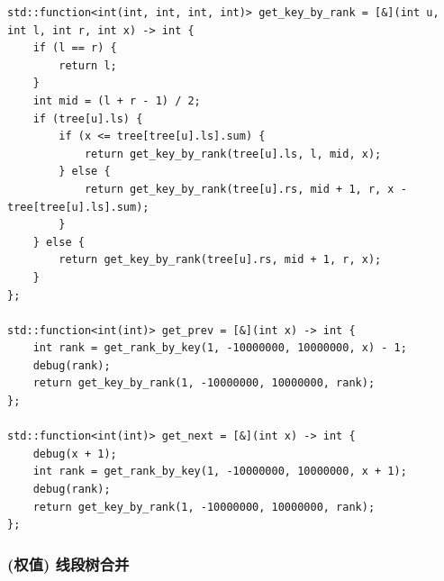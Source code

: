 \documentclass[UTF8, a4paper, titlepage, twoside]{ctexart}
\begin{document}
\begin{lstlisting}[style = cpp]
std::function<int(int, int, int, int)> get_key_by_rank = [&](int u, int l, int r, int x) -> int {
    if (l == r) {
        return l;
    }
    int mid = (l + r - 1) / 2;
    if (tree[u].ls) {
        if (x <= tree[tree[u].ls].sum) {
            return get_key_by_rank(tree[u].ls, l, mid, x);
        } else {
            return get_key_by_rank(tree[u].rs, mid + 1, r, x - tree[tree[u].ls].sum);
        }
    } else {
        return get_key_by_rank(tree[u].rs, mid + 1, r, x);
    }
};

std::function<int(int)> get_prev = [&](int x) -> int {
    int rank = get_rank_by_key(1, -10000000, 10000000, x) - 1;
    debug(rank);
    return get_key_by_rank(1, -10000000, 10000000, rank);
};

std::function<int(int)> get_next = [&](int x) -> int {
    debug(x + 1);
    int rank = get_rank_by_key(1, -10000000, 10000000, x + 1);
    debug(rank);
    return get_key_by_rank(1, -10000000, 10000000, rank);
};
\end{lstlisting}

\subsubsection{ (权值) 线段树合并 }
\end{document}
